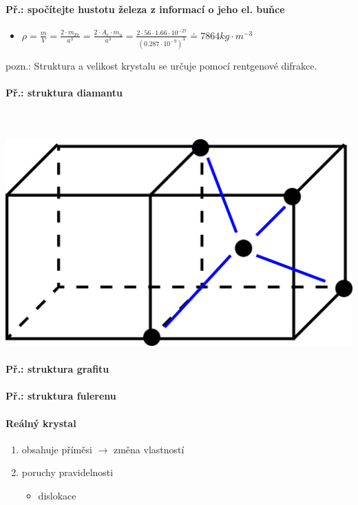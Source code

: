 \documentclass[10pt,a4paper]{article}
\begin{document}
\paragraph{Př.: spočítejte hustotu železa z informací o jeho el. buňce}
\begin{itemize}
\item $\rho = \frac{m}{V} = \frac{2 \cdot m_{Fe} }{a^3} = \frac{2 \cdot A_r \cdot m_u }{a^3} = \frac{2 \cdot 56 \cdot 1.66 \cdot 10^{-27}}{(0.287 \cdot 10^{-9})^3} \doteq 7864kg \cdot m^{-3} $
\end{itemize}
pozn.: Struktura a velikost krystalu se určuje pomocí rentgenové difrakce. 

\paragraph{Př.: struktura diamantu}\mbox{}\\ \mbox{} \\
\includegraphics[scale=0.5]{pictures/002.png}
\paragraph{Př.: struktura grafitu}

\paragraph{Př.: struktura fulerenu}

\paragraph{Reálný krystal}
\begin{enumerate}
\item obsahuje příměsi $\rightarrow$ změna vlastností
\item poruchy pravidelnosti
\begin{itemize}
\item dislokace
\end{itemize}
\end{enumerate}
\end{document}

